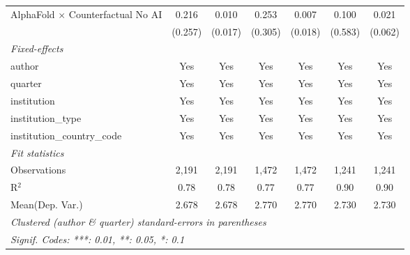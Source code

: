 \begin{tabular}{lcccccc}
   AlphaFold $\times$ Counterfactual No AI  & 0.216   & 0.010       & 0.253   & 0.007   & 0.100   & 0.021\\   
                                            & (0.257) & (0.017)     & (0.305) & (0.018) & (0.583) & (0.062)\\   
   \midrule
   \emph{Fixed-effects}\\
   author                                   & Yes     & Yes         & Yes     & Yes     & Yes     & Yes\\  
   quarter                                  & Yes     & Yes         & Yes     & Yes     & Yes     & Yes\\  
   institution                              & Yes     & Yes         & Yes     & Yes     & Yes     & Yes\\  
   institution\_type                        & Yes     & Yes         & Yes     & Yes     & Yes     & Yes\\  
   institution\_country\_code               & Yes     & Yes         & Yes     & Yes     & Yes     & Yes\\  
   \midrule
   \emph{Fit statistics}\\
   Observations                             & 2,191   & 2,191       & 1,472   & 1,472   & 1,241   & 1,241\\  
   R$^2$                                    & 0.78    & 0.78        & 0.77    & 0.77    & 0.90    & 0.90\\  
Mean(Dep. Var.) & 2.678 & 2.678 & 2.770 & 2.770 & 2.730 & 2.730 \\
   \midrule \midrule
   \multicolumn{7}{l}{\emph{Clustered (author \& quarter) standard-errors in parentheses}}\\
   \multicolumn{7}{l}{\emph{Signif. Codes: ***: 0.01, **: 0.05, *: 0.1}}\\
\end{tabular}
\par\endgroup
